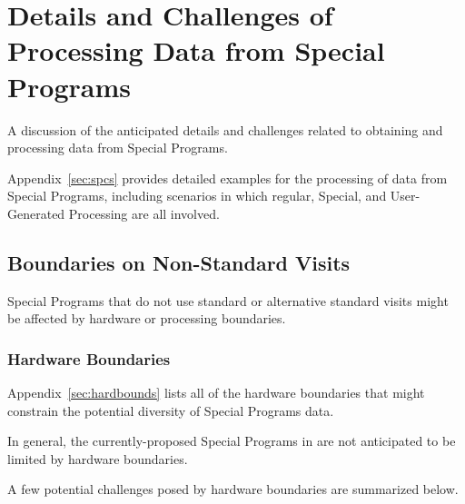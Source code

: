 \section{Details and Challenges of Processing Data from Special Programs}\label{sec:proc}

A discussion of the anticipated details and challenges related to 
obtaining and processing data from Special Programs.

Appendix~\ref{sec:spcs} provides detailed examples for the processing
of data from Special Programs, including scenarios in which regular,
Special, and User-Generated Processing are all involved.

\subsection{Boundaries on Non-Standard Visits} \label{ssec:proc_bounds}

Special Programs that do not use standard or alternative standard visits
might be affected by hardware or processing boundaries.

\subsubsection{Hardware Boundaries}\label{ssec:proc_bounds_hardware}

Appendix~\ref{sec:hardbounds} lists all of the hardware boundaries that 
might constrain the potential diversity of Special Programs data.

In general, the currently-proposed Special Programs in 
are not anticipated to be limited by hardware boundaries.

A few potential challenges posed by hardware
boundaries are summarized below.

